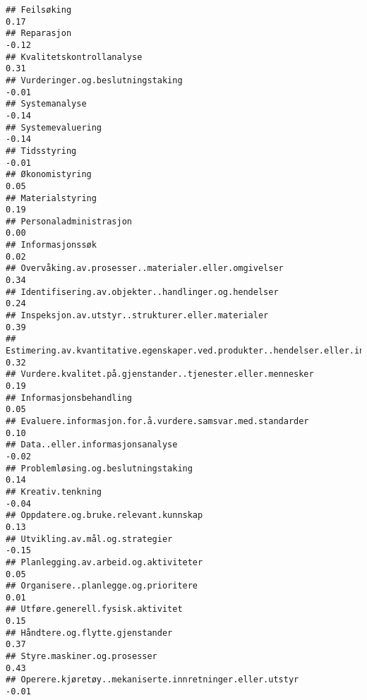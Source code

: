 \documentclass[
]{article}
\begin{document}
\begin{verbatim}
## Feilsøking                                                                        0.17
## Reparasjon                                                                       -0.12
## Kvalitetskontrollanalyse                                                          0.31
## Vurderinger.og.beslutningstaking                                                 -0.01
## Systemanalyse                                                                    -0.14
## Systemevaluering                                                                 -0.14
## Tidsstyring                                                                      -0.01
## Økonomistyring                                                                    0.05
## Materialstyring                                                                   0.19
## Personaladministrasjon                                                            0.00
## Informasjonssøk                                                                   0.02
## Overvåking.av.prosesser..materialer.eller.omgivelser                              0.34
## Identifisering.av.objekter..handlinger.og.hendelser                               0.24
## Inspeksjon.av.utstyr..strukturer.eller.materialer                                 0.39
## Estimering.av.kvantitative.egenskaper.ved.produkter..hendelser.eller.informasjon  0.32
## Vurdere.kvalitet.på.gjenstander..tjenester.eller.mennesker                        0.19
## Informasjonsbehandling                                                            0.05
## Evaluere.informasjon.for.å.vurdere.samsvar.med.standarder                         0.10
## Data..eller.informasjonsanalyse                                                  -0.02
## Problemløsing.og.beslutningstaking                                                0.14
## Kreativ.tenkning                                                                 -0.04
## Oppdatere.og.bruke.relevant.kunnskap                                              0.13
## Utvikling.av.mål.og.strategier                                                   -0.15
## Planlegging.av.arbeid.og.aktiviteter                                              0.05
## Organisere..planlegge.og.prioritere                                               0.01
## Utføre.generell.fysisk.aktivitet                                                  0.15
## Håndtere.og.flytte.gjenstander                                                    0.37
## Styre.maskiner.og.prosesser                                                       0.43
## Operere.kjøretøy..mekaniserte.innretninger.eller.utstyr                          -0.01

\end{verbatim}
\end{document}
